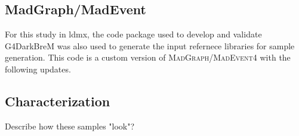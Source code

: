 \subsection{MadGraph/MadEvent}
For this study in \ac{ldmx}, the code package used to develop and validate G4DarkBreM
was also used to generate the input refernece libraries for sample generation.
This code is a custom version of \textsc{MadGraph/MadEvent4} with the following updates.

\subsection{Characterization}
Describe how these samples "look"?

